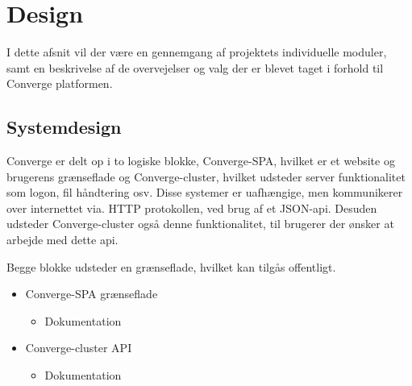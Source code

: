 \chapter{Design}

I dette afsnit vil der være en gennemgang af projektets individuelle moduler, samt en beskrivelse af de overvejelser og valg der er blevet taget i forhold til Converge platformen.

\section{Systemdesign}

Converge er delt op i to logiske blokke, Converge-SPA, hvilket er et website og brugerens grænseflade og Converge-cluster, hvilket udsteder server funktionalitet som logon, fil håndtering osv. Disse systemer er uafhængige, men kommunikerer over internettet via. HTTP protokollen, ved brug af et JSON-api. Desuden udsteder Converge-cluster også denne funktionalitet, til brugerer der ønsker at arbejde med dette api.

Begge blokke udsteder en grænseflade, hvilket kan tilgås offentligt.

\begin{itemize}
  \item Converge-SPA grænseflade
  \begin{itemize}
    \item Dokumentation \cite[Converge-SPA]{software-design}
  \end{itemize}
  \item Converge-cluster API
  \begin{itemize}
    \item Dokumentation \cite[Converge-cluster]{software-design}
  \end{itemize}
\end{itemize}

\newpage